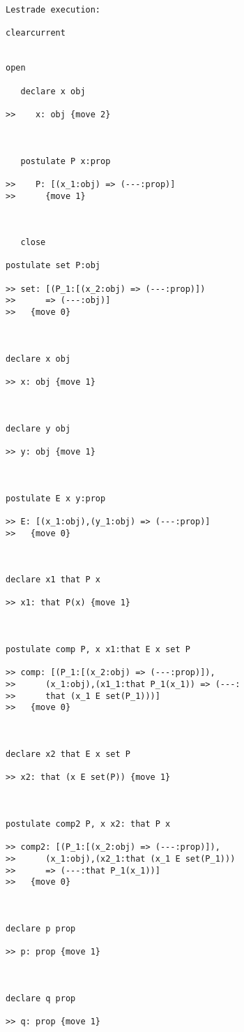 \begin{verbatim}Lestrade execution:

clearcurrent


open

   declare x obj

>>    x: obj {move 2}



   postulate P x:prop

>>    P: [(x_1:obj) => (---:prop)]
>>      {move 1}



   close

postulate set P:obj

>> set: [(P_1:[(x_2:obj) => (---:prop)])
>>      => (---:obj)]
>>   {move 0}



declare x obj

>> x: obj {move 1}



declare y obj

>> y: obj {move 1}



postulate E x y:prop

>> E: [(x_1:obj),(y_1:obj) => (---:prop)]
>>   {move 0}



declare x1 that P x

>> x1: that P(x) {move 1}



postulate comp P, x x1:that E x set P

>> comp: [(P_1:[(x_2:obj) => (---:prop)]),
>>      (x_1:obj),(x1_1:that P_1(x_1)) => (---:
>>      that (x_1 E set(P_1)))]
>>   {move 0}



declare x2 that E x set P

>> x2: that (x E set(P)) {move 1}



postulate comp2 P, x x2: that P x

>> comp2: [(P_1:[(x_2:obj) => (---:prop)]),
>>      (x_1:obj),(x2_1:that (x_1 E set(P_1)))
>>      => (---:that P_1(x_1))]
>>   {move 0}



declare p prop

>> p: prop {move 1}



declare q prop

>> q: prop {move 1}




\end{verbatim}
